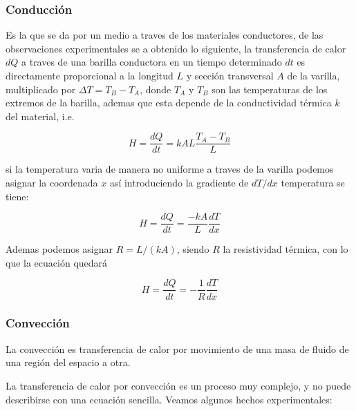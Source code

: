 \subsubsection{Conducción}\label{subsub:coduction}
Es la que se da por un medio a traves de los materiales conductores, de 
las observaciones experimentales se a obtenido lo 
siguiente, la transferencia de calor $dQ$ a traves de una
barilla conductora en un tiempo determinado $dt$ es directamente proporcional a la longitud $L$ y sección transversal
$A$ de la varilla, multiplicado por $\Delta T = T_B - T_A$, donde
$T_A$ y $T_B$ son las temperaturas de los extremos de la barilla,
ademas que esta depende de la conductividad térmica $k$ del 
material, i.e.

\begin{equation}
    \label{eq:conduccion}
    H = \frac{dQ}{dt} = kAL\frac{T_A - T_B}{L}
\end{equation}

si la temperatura varia
de manera no uniforme a traves 
de la varilla podemos
asignar la coordenada $x$ así introduciendo
la gradiente de $dT/dx$ temperatura se tiene:

\begin{equation}
    \label{eq:conduccion-x}
    H = \frac{dQ}{dt} = \frac{-kA}{L}\frac{dT}{dx}
\end{equation}

Ademas podemos asignar $R = L/(kA)$, siendo $R$ la resistividad
térmica, con lo que la ecuación quedará

\begin{equation}
    \label{eq:conduccion-r}
    H = \frac{dQ}{dt} = -\frac{1}{R}\frac{dT}{dx}
\end{equation}

\subsubsection{Convección}
La convección es transferencia de calor por movimiento de una masa de fluido de una
región del espacio a otra.

La transferencia de calor por convección es un proceso muy complejo, y no puede
describirse con una ecuación sencilla. Veamos algunos hechos experimentales:

